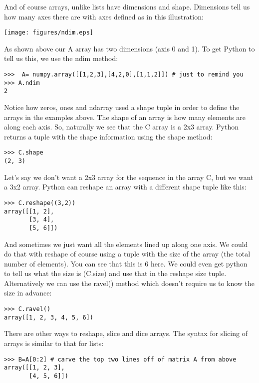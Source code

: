 { And of course  arrays, unlike lists have dimensions and shape.  Dimensions tell us how many axes there are with axes defined as in this illustration:

   \texttt{[image: figures/ndim.eps]} 
   
   As shown above our {\color{blue}A} array has two dimensions (axis 0 and 1).  To get Python to tell us this, we use the {\color{blue}ndim} method:
   
   {\singlespacing \color{blue} \begin{verbatim}
>>>  A= numpy.array([[1,2,3],[4,2,0],[1,1,2]]) # just to remind you
>>> A.ndim
2
\end{verbatim}}
Notice how {\color{blue}zeros, ones} and {\color{blue}ndarray} used a shape tuple in order to define the arrays in the examples above.   The shape of an array is how many elements are along each axis.  So, naturally we see that the C array is a 2x3 array.  Python returns a tuple with the shape information using the {\color{blue}shape} method:
{\singlespacing \color{blue} \begin{verbatim}
>>> C.shape
(2, 3)
\end{verbatim}}

Let's say we don't want a 2x3 array for the sequence in the array {\color{blue}C}, but we want a 3x2 array.  Python can reshape an array with a different shape tuple like this:
   {\singlespacing \color{blue} \begin{verbatim}
>>> C.reshape((3,2))
array([[1, 2],
       [3, 4],
       [5, 6]])
\end{verbatim}}

And sometimes we just want all the elements lined up along one axis. We could do that with {\color{blue}reshape} of course using a tuple  with the size of the array (the total number of elements). You  can see that this is 6 here. We could even get python to tell us what the size is ({\color{blue}C.size}) and use that in the reshape size tuple.  Alternatively we can use the {\color{blue}ravel()} method which doesn't require us to know the size in advance:

   {\singlespacing \color{blue} \begin{verbatim}
>>> C.ravel()
array([1, 2, 3, 4, 5, 6])
\end{verbatim}}   

There are other ways to reshape, slice and dice arrays.  
The syntax for slicing of arrays is similar to that for lists:  
{\singlespacing \color{blue} \begin{verbatim}
>>> B=A[0:2] # carve the top two lines off of matrix A from above
array([[1, 2, 3],
       [4, 5, 6]])
\end{verbatim}}

}
